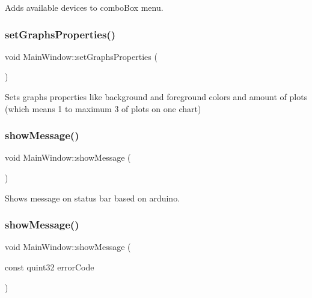 Adds available devices to combo\+Box menu. 

\mbox{\label{class_main_window_a9a1bad7a80ca8e1c5075d80143957754}} 
\subsubsection{set\+Graphs\+Properties()}
{\footnotesize\ttfamily void Main\+Window\+::set\+Graphs\+Properties (\begin{DoxyParamCaption}{ }\end{DoxyParamCaption})\hspace{0.3cm}{\ttfamily [private]}}



Sets graphs properties like background and foreground colors and amount of plots (which means 1 to maximum 3 of plots on one chart) 

\mbox{\label{class_main_window_a366da6a45407c523f570ca9e4f4b40a4}} 
\subsubsection{show\+Message()\hspace{0.1cm}{\footnotesize\ttfamily [1/2]}}
{\footnotesize\ttfamily void Main\+Window\+::show\+Message (\begin{DoxyParamCaption}{ }\end{DoxyParamCaption})\hspace{0.3cm}{\ttfamily [private]}}



Shows message on status bar based on arduino. 

\mbox{\label{class_main_window_a365152de4a1878ab0087816da6a9431a}} 
\subsubsection{show\+Message()\hspace{0.1cm}{\footnotesize\ttfamily [2/2]}}
{\footnotesize\ttfamily void Main\+Window\+::show\+Message (\begin{DoxyParamCaption}\item[{const quint32}]{error\+Code }\end{DoxyParamCaption})\hspace{0.3cm}{\ttfamily [private]}}




